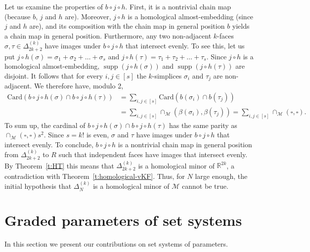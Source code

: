 \documentclass[11pt]{article}
\newcommand{\R}{\mathbb{R}}
\newcommand{\M}{\mathcal{M}}
\DeclareMathOperator{\supp}{supp}
\newcommand{\card}[1]{\textrm{Card}\pth{#1}}
\newcommand{\pth}[1]{\left(#1\right)}
\begin{document}
%
\medskip
%
Let us examine the properties of $b\circ j \circ h$. First, it is a nontrivial chain map (because $b$, $j$ and $h$ are). Moreover, $j \circ h$ is a homological almost-embedding (since $j$ and $h$ are), and its composition with the chain map in general position $b$ yields a chain map in general position. Furthermore, any two non-adjacent $k$-faces $\sigma,\tau \in \Delta_{2k+2}^{(k)}$ have images under $b\circ j \circ h$ that intersect evenly. To see this, let us put $j \circ h(\sigma) = \sigma_1+\sigma_2+\ldots +\sigma_s$ and $j \circ h(\tau) = \tau_1+\tau_2+\ldots+\tau_s$. Since $j \circ h$ is a homological almost-embedding, $\supp(j \circ h(\sigma))$ and $\supp(j \circ h(\tau))$ are disjoint. It follows that for every $i,j \in [s]$ the $k$-simplices $\sigma_i$ and $\tau_j$ are non-adjacent. We therefore have, modulo 2, 
%
\[\begin{aligned}
\card{b\circ j \circ h(\sigma) \cap b\circ j \circ h(\tau)} &= \sum_{i,j \in [s]} \card{b(\sigma_i) \cap b(\tau_j)}\\
&= \sum_{i,j \in [s]} \cap_{\M}(\beta(\sigma_i),\beta(\tau_j)) = \sum_{i,j \in [s]} \cap_{\M}(\square,\square).
\end{aligned}  \]
%
\noindent
To sum up, the cardinal of $b\circ j \circ h(\sigma) \cap b\circ j \circ h(\tau)$ has the same parity as $\cap_{\M}(\square,\square)s^2$. Since $s=k!$ is even, $\sigma$ and $\tau$ have images under $b\circ j \circ h$ that intersect evenly.
%
\medskip
%
To conclude, $b\circ j \circ h$ is a nontrivial chain map in general position from $\Delta_{2k+2}^{(k)}$ to $R$ such that independent faces have images that intersect evenly. By Theorem~\ref{t:HT} this means that $\Delta_{2k+2}^{(k)}$ is a homological minor of $\R^{2k}$, a contradiction with Theorem~\ref{t:homological-vKF}. Thus, for $N$ large enough, the initial hypothesis that $\Delta_N^{(k)}$ is a homological minor of $\M$ cannot be true.
%
%
%
\section{Graded parameters of set systems}\label{s:graded}
%
In this section we present our contributions on set systems of parameters. %
%
%
\end{document}
